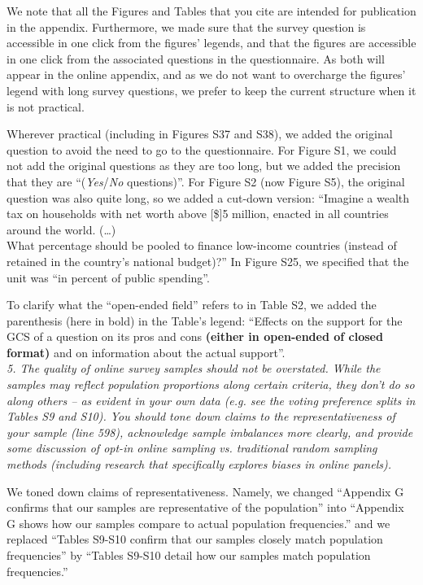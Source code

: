 \documentclass[12pt,english]{article}
\begin{document}
We note that all the Figures and Tables that you cite are intended for publication in the appendix. Furthermore, we made sure that the survey question is accessible in one click from the figures' legends, and that the figures are accessible in one click from the associated questions in the questionnaire. As both will appear in the online appendix, and as we do not want to overcharge the figures' legend with long survey questions, we prefer to keep the current structure when it is not practical. 

Wherever practical (including in Figures S37 and S38), we added the original question to avoid the need to go to the questionnaire. For Figure S1, we could not add the original questions as they are too long, but we added the precision that they are ``(\textit{Yes}/\textit{No} questions)''. For Figure S2 (now Figure S5), the original question was also quite long, so we added a cut-down version: ``Imagine a wealth tax on households with net worth above [\$]5 million, enacted in all countries around the world.  
(\dots)  \\ What percentage should be pooled to finance low-income countries (instead of retained in the country's national budget)?''
In Figure S25, we specified that the unit was ``in percent of public spending''.

To clarify what the ``open-ended field'' refers to in Table S2, %
we added the parenthesis (here in bold) in the Table's legend: ``Effects on the support for the GCS of a question on its pros and cons \textbf{(either in open-ended of closed format)} and on information about the actual support''.
~\\

\textit{5. The quality of online survey samples should not be overstated. While the samples may reflect population proportions along certain criteria, they don’t do so along others – as evident in your own data (e.g. see the voting preference splits in Tables S9 and S10). You should tone down claims to the representativeness of your sample (line 598), acknowledge sample imbalances more clearly, and provide some discussion of opt-in online sampling vs. traditional random sampling methods (including research that specifically explores biases in online panels).}

We toned down claims of representativeness. Namely, we changed ``Appendix G confirms that our samples are representative of the population'' into ``Appendix G shows how our samples compare to actual population frequencies.'' and we replaced ``Tables S9-S10 confirm that our samples closely match population frequencies'' by ``Tables S9-S10 %
detail how our samples match population frequencies.'' 
\end{document}

